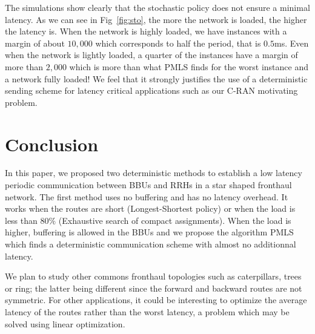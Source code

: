 \documentclass[10pt, conference, letterpaper]{IEEEtran}
\begin{document}
     The simulations show clearly that the stochastic policy does not ensure a minimal latency. As we can see in Fig~\ref{fig:sto}, the more the network is loaded, the higher the latency is. When the network is highly loaded, we have instances with a margin of about $10,000$ which corresponds to half the period, that is $0.5$ms. Even when the network is lightly loaded, a quarter of the instances have a margin of more than $2,000$ which is more than what PMLS finds for the worst instance and a network fully loaded! We feel that it strongly justifies the use of a deterministic sending scheme for latency critical applications such as our C-RAN motivating problem.
     
     
 \section{Conclusion}
In this paper, we proposed two deterministic methods to establish a low latency periodic communication between BBUs and RRHs in 
a star shaped fronthaul network. The first method uses no buffering and has no latency overhead. It works when the routes are short (Longest-Shortest policy) or when the load is less than $80\%$ (Exhaustive search of compact assignments).  
When the load is higher, buffering is allowed in the BBUs and we propose the algorithm PMLS which  finds a deterministic communication scheme with almost no additionnal latency.

We plan to study other commons fronthaul topologies such as caterpillars, trees or ring; the latter being different since 
the forward and backward routes are not symmetric. For other applications, it could be interesting to optimize the average latency of the routes rather than the worst latency, a problem which may be solved using linear optimization.  

%    
% 

%   



\end{document}
